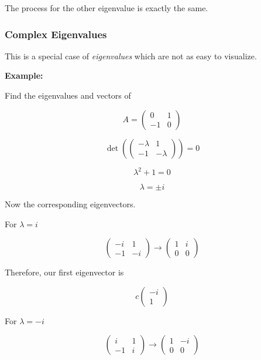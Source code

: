 The process for the other eigenvalue is exactly the same.

\subsubsection{Complex Eigenvalues}

This is a special case of \emph{eigenvalues} which are not as easy to visualize.

\textbf{Example:}

Find the eigenvalues and vectors of

\[
    A = \begin{pmatrix}
        0 & 1 \\
        -1 & 0 
    \end{pmatrix}
\]

\[
    \det\left( 
    \begin{pmatrix}
        -\lambda & 1 \\
        -1 & -\lambda
    \end{pmatrix}
    \right) = 0
\]

\[
    \lambda^2 + 1 = 0 
\]

\[
    \lambda = \pm i
\]

Now the corresponding eigenvectors.

For \(\lambda = i\)

\[     
    \begin{pmatrix}
        -i & 1 \\
        -1 & -i
    \end{pmatrix}
    \rightarrow
    \begin{pmatrix}
        1 & i \\
        0 & 0
    \end{pmatrix} 
\]

Therefore, our first eigenvector is 

\[  
    c
    \begin{pmatrix}
        -i \\
        1        
    \end{pmatrix}
\]

For \(\lambda = -i\)

\[     
    \begin{pmatrix}
        i & 1 \\
        -1 & i
    \end{pmatrix}
    \rightarrow
    \begin{pmatrix}
        1 & -i \\
        0 & 0
    \end{pmatrix} 
\]


